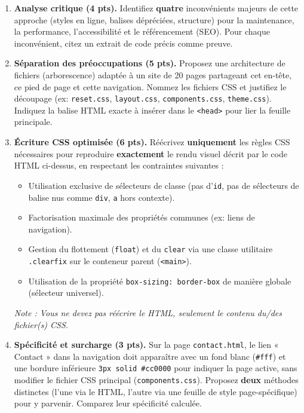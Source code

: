 \documentclass[11pt]{article}
\begin{document}
\begin{exercice}
\begin{enumerate}
\item \textbf{Analyse critique (4 pts).} Identifiez \textbf{quatre} inconvénients majeurs de cette approche (styles en ligne, balises dépréciées, structure) pour la maintenance, la performance, l'accessibilité et le référencement (SEO). Pour chaque inconvénient, citez un extrait de code précis comme preuve.
\item \textbf{Séparation des préoccupations (5 pts).} Proposez une architecture de fichiers (arborescence) adaptée à un site de 20 pages partageant cet en-tête, ce pied de page et cette navigation. Nommez les fichiers CSS et justifiez le découpage (ex: \texttt{reset.css}, \texttt{layout.css}, \texttt{components.css}, \texttt{theme.css}). Indiquez la balise HTML exacte à insérer dans le \texttt{<head>} pour lier la feuille principale.
\item \textbf{Écriture CSS optimisée (6 pts).} Réécrivez \textbf{uniquement} les règles CSS nécessaires pour reproduire \textbf{exactement} le rendu visuel décrit par le code HTML ci-dessus, en respectant les contraintes suivantes :
      \begin{itemize}
          \item Utilisation exclusive de sélecteurs de classe (pas d'\texttt{id}, pas de sélecteurs de balise nus comme \texttt{div}, \texttt{a} hors contexte).
          \item Factorisation maximale des propriétés communes (ex: liens de navigation).
          \item Gestion du flottement (\texttt{float}) et du \texttt{clear} via une classe utilitaire \texttt{.clearfix} sur le conteneur parent (\texttt{<main>}).
          \item Utilisation de la propriété \texttt{box-sizing: border-box} de manière globale (sélecteur universel).
      \end{itemize}
      \textit{Note : Vous ne devez pas réécrire le HTML, seulement le contenu du/des fichier(s) CSS.}
\item \textbf{Spécificité et surcharge (3 pts).} Sur la page \texttt{contact.html}, le lien « Contact » dans la navigation doit apparaître avec un fond blanc (\texttt{\#fff}) et une bordure inférieure \texttt{3px solid \#cc0000} pour indiquer la page active, sans modifier le fichier CSS principal (\texttt{components.css}). Proposez \textbf{deux} méthodes distinctes (l'une via le HTML, l'autre via une feuille de style page-spécifique) pour y parvenir. Comparez leur spécificité calculée.
\end{enumerate}
\end{exercice}
\end{document}

